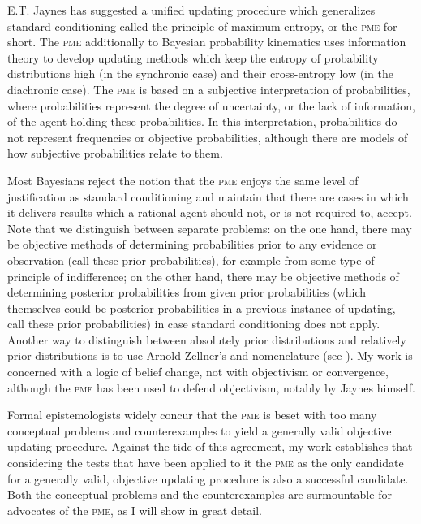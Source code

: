 E.T. Jaynes has suggested a unified updating procedure which
generalizes standard conditioning called the principle of maximum
entropy, or the \textsc{pme} for short. The \textsc{pme} additionally
to Bayesian probability kinematics uses information theory to develop
updating methods which keep the entropy of probability distributions
high (in the synchronic case) and their cross-entropy low (in the
diachronic case). The \textsc{pme} is based on a subjective
interpretation of probabilities, where probabilities represent the
degree of uncertainty, or the lack of information, of the agent
holding these probabilities. In this interpretation, probabilities do
not represent frequencies or objective probabilities, although there
are models of how subjective probabilities relate to them.

Most Bayesians reject the notion that the \textsc{pme} enjoys the same
level of justification as standard conditioning and maintain that
there are cases in which it delivers results which a rational agent
should not, or is not required to, accept. Note that we distinguish
between separate problems: on the one hand, there may be objective
methods of determining probabilities prior to any evidence or
observation (call these  prior probabilities), for
example from some type of principle of indifference; on the other
hand, there may be objective methods of determining posterior
probabilities from given prior probabilities (which themselves could
be posterior probabilities in a previous instance of updating, call
these  prior probabilities) in case standard
conditioning does not apply. Another way to distinguish between
absolutely prior distributions and relatively prior distributions is
to use Arnold Zellner's  and 
nomenclature (see ). My work is concerned with a
logic of belief change, not with objectivism or convergence, although
the \textsc{pme} has been used to defend objectivism, notably by
Jaynes himself.

Formal epistemologists widely concur that the \textsc{pme} is beset
with too many conceptual problems and counterexamples to yield a
generally valid objective updating procedure. Against the tide of this
agreement, my work establishes that considering the tests that have
been applied to it the \textsc{pme} as the only candidate for a
generally valid, objective updating procedure is also a successful
candidate. Both the conceptual problems and the counterexamples are
surmountable for advocates of the \textsc{pme}, as I will show in
great detail.


